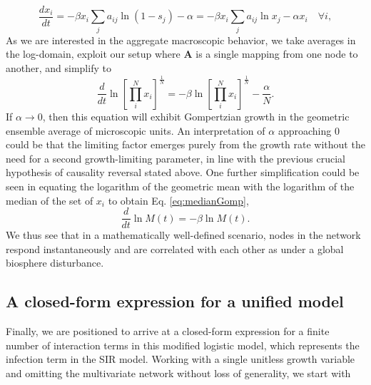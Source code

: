 \documentclass{article}
\begin{document}
\begin{equation}
\frac{d x_i}{dt} = -\beta x_i\sum_j{a_{ij}}\ln{(1 - s_j)} - \alpha = -\beta x_i\sum_j{a_{ij}}\ln{x_j} - \alpha x_i \quad \forall i,
\end{equation}
As we are interested in the aggregate macroscopic behavior, we take averages in the log-domain, exploit our setup where $\mathbf{A}$ is a single mapping from one node to another, and simplify to
\begin{equation}
\frac{d}{{dt}} \ln\left[\prod_i^N{x_i}\right]^{\frac{1}{N}} = -\beta\ln\left[\prod_i^N{x_i}\right]^{\frac{1}{N}} - \frac{\alpha}{N}.
\end{equation}
If $\alpha\rightarrow 0$, then this equation will exhibit Gompertzian growth in the geometric ensemble average of microscopic units. 
An interpretation of $\alpha$ approaching $0$ could be that the limiting factor emerges purely from the growth rate without the need for a second growth-limiting parameter, in line with the previous crucial hypothesis of causality reversal stated above. One further simplification could be seen in equating the logarithm of the geometric mean with the logarithm of the median of the set of $x_i$ to obtain Eq. \ref{eq:medianGomp},
\begin{equation}
\frac{d}{dt}\ln{M(t)} = -\beta \ln{M(t)}.
\end{equation}
We thus see that in a mathematically well-defined scenario, nodes in the network respond instantaneously and are correlated with each other as under a global biosphere disturbance.

\subsection*{A closed-form expression for a unified model}
Finally, we are positioned to arrive at a closed-form expression for a finite number of interaction terms in this modified logistic model, which represents the infection term in the SIR model. Working with a single unitless growth variable and omitting the multivariate network without loss of generality, we start with
\end{document}
